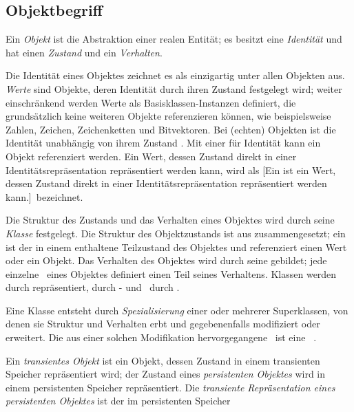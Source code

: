 \subsection{Objektbegriff}
%
Ein {\em Objekt\/} ist die Abstraktion einer realen Entit\"{a}t; es
besitzt eine {\em Identit\"{a}t\/} und hat einen {\em Zustand\/} und ein
{\em Verhalten\/}.
%
\par{}Die Identit\"{a}t eines Objektes zeichnet es als einzigartig unter
allen Objekten aus. {\em Werte\/} sind Objekte, deren Identit\"{a}t durch
ihren Zustand festgelegt wird; weiter einschr\"{a}nkend werden Werte als
Basisklassen-Instanzen definiert, die grunds\"{a}tzlich keine weiteren
Objekte referenzieren k\"{o}nnen, wie beispielsweise Zahlen, Zeichen,
Zeichenketten und Bitvektoren.  Bei (\rglq{}echten\rgrq) Objekten ist
die Identit\"{a}t
unabh\"{a}ngig von ihrem Zustand \cite[]{bib:sche92}.  Mit
einer \representationform{} f\"{u}r Identit\"{a}t kann ein Objekt
referenziert werden. Ein Wert, dessen Zustand direkt in einer
Iden\-ti\-t\"{a}ts\-re\-pr\"{a}\-sen\-ta\-tion repr\"{a}sentiert werden kann,
wird als \immval{}[{Ein \protect\immval\/ ist ein
Wert, dessen Zustand direkt in einer
Iden\-ti\-t\"{a}ts\-re\-pr\"{a}\-sen\-tat\-ion repr\"{a}sentiert werden
kann.}]\ bezeichnet.
%
\par{}Die Struktur des Zustands und das Verhalten eines
Objektes wird durch seine {\em Klasse\/} festgelegt. Die Struktur des
Objektzustands ist aus \Slt[s]\/ zusammengesetzt; ein
 ist der in einem \Slt\/ enthaltene Teilzustand des
Objektes und referenziert einen Wert oder ein Objekt.  Das Verhalten
des Objektes wird durch seine {\em\mtd[n]\/} gebildet; jede einzelne
\mtd\ eines Objektes definiert einen Teil seines Verhaltens. Klassen
werden durch {\em\clsmo[e]\/} repr\"{a}sentiert, \Slt[s]\/ durch
\Slt-{\em\mo[e]\/} und \mtd[n]\ durch {\em\mtdmo[e]\/}.
%
\par{}Eine Klasse entsteht durch {\em Spezialisierung\/} einer oder
mehrerer Superklassen, von denen sie Struktur und Verhalten erbt und
gegebenenfalls modifiziert oder erweitert. Die aus einer solchen
Modifikation hervorgegangene \mtd\ ist eine {\em\spc\ \mtd\/}.
%
\par{}Ein {\em transientes Objekt\/} ist ein Objekt, dessen Zustand in
einem transienten Speicher re\-pr\"{a}\-sen\-tiert wird; der Zustand
eines {\em persistenten Objektes\/} wird in einem persistenten
Speicher repr\"{a}sentiert.  Die {\em transiente Repr\"{a}sentation eines
persistenten Objektes\/} ist der im persistenten Speicher
